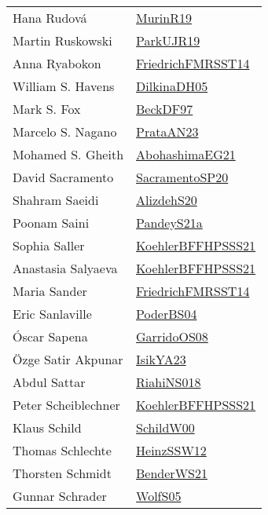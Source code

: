 {\begin{longtable}{p{4cm}p{20cm}}
Hana Rudov{\'{a}} & \href{papers/MurinR19.pdf}{MurinR19}\cite{MurinR19} \\
Martin Ruskowski & \href{papers/ParkUJR19.pdf}{ParkUJR19}\cite{ParkUJR19} \\
Anna Ryabokon & \href{}{FriedrichFMRSST14}\cite{FriedrichFMRSST14} \\
William S. Havens & \href{papers/DilkinaDH05.pdf}{DilkinaDH05}\cite{DilkinaDH05} \\
Mark S. Fox & \href{papers/BeckDF97.pdf}{BeckDF97}\cite{BeckDF97} \\
Marcelo S. Nagano & \href{articles/PrataAN23.pdf}{PrataAN23}\cite{PrataAN23} \\
Mohamed S. Gheith & \href{articles/AbohashimaEG21.pdf}{AbohashimaEG21}\cite{AbohashimaEG21} \\
David Sacramento & \href{articles/SacramentoSP20.pdf}{SacramentoSP20}\cite{SacramentoSP20} \\
Shahram Saeidi & \href{}{AlizdehS20}\cite{AlizdehS20} \\
Poonam Saini & \href{articles/PandeyS21a.pdf}{PandeyS21a}\cite{PandeyS21a} \\
Sophia Saller & \href{articles/KoehlerBFFHPSSS21.pdf}{KoehlerBFFHPSSS21}\cite{KoehlerBFFHPSSS21} \\
Anastasia Salyaeva & \href{articles/KoehlerBFFHPSSS21.pdf}{KoehlerBFFHPSSS21}\cite{KoehlerBFFHPSSS21} \\
Maria Sander & \href{}{FriedrichFMRSST14}\cite{FriedrichFMRSST14} \\
Eric Sanlaville & \href{articles/PoderBS04.pdf}{PoderBS04}\cite{PoderBS04} \\
{\'{O}}scar Sapena & \href{articles/GarridoOS08.pdf}{GarridoOS08}\cite{GarridoOS08} \\
{\"{O}}zge Satir Akpunar & \href{articles/IsikYA23.pdf}{IsikYA23}\cite{IsikYA23} \\
Abdul Sattar & \href{papers/RiahiNS018.pdf}{RiahiNS018}\cite{RiahiNS018} \\
Peter Scheiblechner & \href{articles/KoehlerBFFHPSSS21.pdf}{KoehlerBFFHPSSS21}\cite{KoehlerBFFHPSSS21} \\
Klaus Schild & \href{articles/SchildW00.pdf}{SchildW00}\cite{SchildW00} \\
Thomas Schlechte & \href{articles/HeinzSSW12.pdf}{HeinzSSW12}\cite{HeinzSSW12} \\
Thorsten Schmidt & \href{papers/BenderWS21.pdf}{BenderWS21}\cite{BenderWS21} \\
Gunnar Schrader & \href{papers/WolfS05.pdf}{WolfS05}\cite{WolfS05} \\

\end{longtable}}
